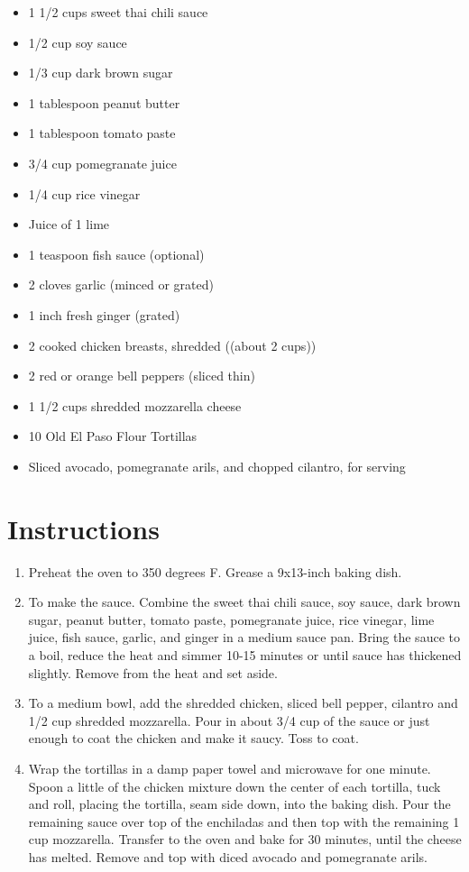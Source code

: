 \documentclass[
  letterpaper,
  DIV=11,
  numbers=noendperiod,
  titlepage=false]{scrreprt}
\providecommand{\tightlist}{%
  \setlength{\itemsep}{0pt}\setlength{\parskip}{0pt}}\usepackage{longtable,booktabs,array}
\begin{document}
\begin{itemize}
\tightlist
\item
  1 1/2 cups sweet thai chili sauce
\item
  1/2 cup soy sauce
\item
  1/3 cup dark brown sugar
\item
  1 tablespoon peanut butter
\item
  1 tablespoon tomato paste
\item
  3/4 cup pomegranate juice
\item
  1/4 cup rice vinegar
\item
  Juice of 1 lime
\item
  1 teaspoon fish sauce (optional)
\item
  2 cloves garlic (minced or grated)
\item
  1 inch fresh ginger (grated)
\item
  2 cooked chicken breasts, shredded ((about 2 cups))
\item
  2 red or orange bell peppers (sliced thin)
\item
  1 1/2 cups shredded mozzarella cheese
\item
  10 Old El Paso Flour Tortillas
\item
  Sliced avocado, pomegranate arils, and chopped cilantro, for serving
\end{itemize}

\section{Instructions}\label{instructions-159}

\begin{enumerate}
\def\labelenumi{\arabic{enumi}.}
\tightlist
\item
  Preheat the oven to 350 degrees F. Grease a 9x13-inch baking dish.
\item
  To make the sauce. Combine the sweet thai chili sauce, soy sauce, dark
  brown sugar, peanut butter, tomato paste, pomegranate juice, rice
  vinegar, lime juice, fish sauce, garlic, and ginger in a medium sauce
  pan. Bring the sauce to a boil, reduce the heat and simmer 10-15
  minutes or until sauce has thickened slightly. Remove from the heat
  and set aside.
\item
  To a medium bowl, add the shredded chicken, sliced bell pepper,
  cilantro and 1/2 cup shredded mozzarella. Pour in about 3/4 cup of the
  sauce or just enough to coat the chicken and make it saucy. Toss to
  coat.
\item
  Wrap the tortillas in a damp paper towel and microwave for one minute.
  Spoon a little of the chicken mixture down the center of each
  tortilla, tuck and roll, placing the tortilla, seam side down, into
  the baking dish. Pour the remaining sauce over top of the enchiladas
  and then top with the remaining 1 cup mozzarella. Transfer to the oven
  and bake for 30 minutes, until the cheese has melted. Remove and top
  with diced avocado and pomegranate arils.
\end{enumerate}
\end{document}

